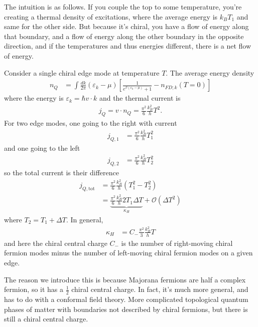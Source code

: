 The intuition is as follows.
If you couple the top to some temperature,
you're creating a thermal density of excitations,
where the average energy is $k_B T_1$
and same for the other side.
But because it's chiral,
you have a flow of energy along that boundary,
and a flow of energy along the other boundary in the opposite direction,
and if the temperatures and thus energies different,
there is a net flow of energy.

Consider a single chiral edge mode at temperature $T$.
The average energy density
\begin{align}
    n_Q &=
    \int \frac{dk}{2\pi}
    \left( \varepsilon_k - \mu \right)\left[ 
    \frac{1}{e^{\beta\left( \varepsilon_k - \mu \right)} + 1}
    - n_{FD;k}(T = 0)
    \right]
\end{align}
where the energy is $\varepsilon_k = \hbar v\cdot k$ and the thermal current is
\begin{align}
    j_Q = v\cdot n_Q = \frac{\pi^2}{6} \frac{k_B^2}{h}T^2.
\end{align}
For two edge modes,
one going to the right with current
\begin{align}
    j_{Q,1} &=
    \frac{\pi^2}{6} \frac{k_B^2}{h} T_1^2
\end{align}
and one going to the left
\begin{align}
    j_{Q,2} &=
    \frac{\pi^2}{6} \frac{k_B^2}{h} T_2^2
\end{align}
so the total current is their difference
\begin{align}
    j_{Q,\mathrm{tot}} &=
    \frac{\pi^2}{6} \frac{k_B^2}{h}
    \left( T_1^2 - T_2^2 \right)\\
    &=
    \underbrace{\frac{\pi^2}{6} \frac{k_B^2}{h} 2T_1 \Delta T}_{\kappa_H}
    + \mathcal{O}\left( \Delta T^2 \right)
\end{align}
where $T_2 = T_1 + \Delta T$.
In general,
\begin{align}
    \kappa_H &=
    C_{-} \frac{\pi^2}{3} \frac{k_B^2}{h}T
\end{align}
and here the chiral central charge $C_{-}$ is the number of right-moving chiral
fermion modes minus the number of left-moving chiral fermion modes on a given
edge.

The reason we introduce this is because
Majorana fermions are half a complex fermion,
so it has a $\frac{1}{2}$ chiral central charge.
In fact,
it's much more general,
and has to do with a conformal field theory.
More complicated topological quantum phases of matter
with boundaries not described by chiral fermions,
but there is still a chiral central charge.

